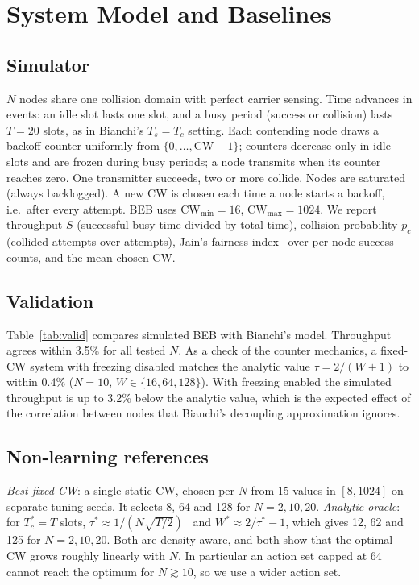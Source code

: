 \documentclass[conference]{IEEEtran}
\begin{document}
\section{System Model and Baselines}\label{sec:model}
\subsection{Simulator}
$N$ nodes share one collision domain with perfect carrier sensing. Time advances in events: an idle slot lasts one slot, and a busy period (success or collision) lasts $T{=}20$ slots, as in Bianchi's $T_s{=}T_c$ setting. Each contending node draws a backoff counter uniformly from $\{0,\dots,\mathrm{CW}-1\}$; counters decrease only in idle slots and are frozen during busy periods; a node transmits when its counter reaches zero. One transmitter succeeds, two or more collide. Nodes are saturated (always backlogged). A new CW is chosen each time a node starts a backoff, i.e.\ after every attempt. BEB uses $\mathrm{CW}_{\min}{=}16$, $\mathrm{CW}_{\max}{=}1024$. We report throughput $S$ (successful busy time divided by total time), collision probability $p_c$ (collided attempts over attempts), Jain's fairness index~\cite{jain1984} over per-node success counts, and the mean chosen CW.

\subsection{Validation}
Table~\ref{tab:valid} compares simulated BEB with Bianchi's model. Throughput agrees within 3.5\% for all tested $N$. As a check of the counter mechanics, a fixed-CW system with freezing disabled matches the analytic value $\tau{=}2/(W{+}1)$ to within 0.4\% ($N{=}10$, $W\in\{16,64,128\}$). With freezing enabled the simulated throughput is up to 3.2\% below the analytic value, which is the expected effect of the correlation between nodes that Bianchi's decoupling approximation ignores.
\begin{table}[t]
\caption{BEB in the simulator versus Bianchi's model (saturated, $T{=}20$, 3 seeds of $2{\times}10^5$ slots).}\label{tab:valid}
\centering\small

\end{table}

\subsection{Non-learning references}
\emph{Best fixed CW}: a single static CW, chosen per $N$ from 15 values in $[8,1024]$ on separate tuning seeds. It selects 8, 64 and 128 for $N{=}2,10,20$. \emph{Analytic oracle}: for $T_c^*{=}T$ slots, $\tau^*\approx 1/(N\sqrt{T/2})$~\cite{bianchi2000} and $W^*\approx 2/\tau^*-1$, which gives 12, 62 and 125 for $N{=}2,10,20$. Both are density-aware, and both show that the optimal CW grows roughly linearly with $N$. In particular an action set capped at 64 cannot reach the optimum for $N\gtrsim 10$, so we use a wider action set.
\end{document}
